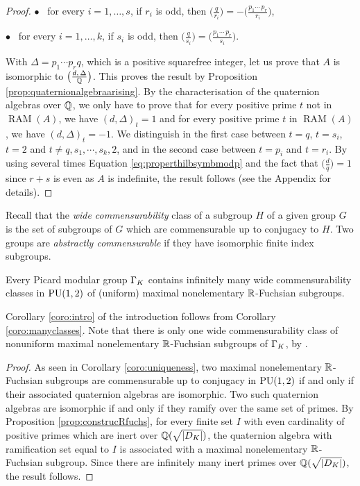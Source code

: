 \documentclass[11pt]{article}
\begin{document}
\begin{proof}
$\bullet$~ for every $i=1,\dots, s$, if $r_i$ is odd, then
$\big(\frac{q}{r_i}\big)= - \big(\frac{p_1\cdots\, p_r} {r_i}\big)$,

$\bullet$~ for every $i=1,\dots, k$, if $s_i$ is odd, then
$\big(\frac{q}{s_i}\big)= \big(\frac{p_1\cdots\, p_r} {s_i}\big)$.



With $\Delta=p_1\cdots p_r q$, which is a positive squarefree integer,
let us prove that $A$ is isomorphic to $\big(\frac{d, \,\Delta}
{{\mathbb Q}}\big)$. This proves the result by Proposition
\ref{prop:quaternionalgebraarising}. By the characterisation of the
quaternion algebras over ${\mathbb Q}$, we only have to prove that for every
positive prime $t$ not in $\operatorname{RAM}(A)$, we have
$(d,\Delta)_t=1$ and for every positive prime $t$ in
$\operatorname{RAM}(A)$, we have $(d,\Delta)_t=-1$. We distinguish in
the first case between $t=q$, $t=s_i$, $t=2$ and $t\neq q,s_1,\cdots,
s_k,2$, and in the second case between $t=p_i$ and $t=r_i$. By using
several times Equation \eqref{eq:properthilbsymbmodp} and the fact
that $\big(\frac{d}{q}\big)=1$ since $r+s$ is even as $A$ is
indefinite, the result follows (see the Appendix for details).
\end{proof}










 Recall that the {\it wide commensurability} class of a
subgroup $H$ of a given group $G$ is the set of subgroups of $G$
which are commensurable up to conjugacy to $H$. Two groups are {\it
  abstractly commensurable} if they have isomorphic finite index
subgroups.


\bcoro\label{coro:manyclasses} Every Picard modular group $\Gamma_K$
contains infinitely many wide commensurability classes in $\operatorname{PU}(1,2)$
of (uniform) maximal nonelementary ${\mathbb R}$-Fuchsian subgroups.  
\ecoro

Corollary \ref{coro:intro} of the introduction follows from Corollary
\ref{coro:manyclasses}. Note that there is only one wide commensurability
class of nonuniform maximal nonelementary
${\mathbb R}$-Fuchsian subgroups of $\Gamma_K$, by \cite[Thm.~8.2.7]{MacRei03}.

\begin{proof} As seen in Corollary \ref{coro:uniqueness}, two maximal
nonelementary ${\mathbb R}$-Fuchsian subgroups are commensurable up to
conjugacy in $\operatorname{PU}(1,2)$ if and only if their associated quaternion
algebras are isomorphic. Two such quaternion algebras are isomorphic
if and only if they ramify over the same set of primes. By Proposition
\ref{prop:construcRfuchs}, for every finite set $I$ with even cardinality of
positive primes which are inert over ${\mathbb Q}(\sqrt{|D_K|})$, the quaternion
algebra with ramification set equal to $I$ is associated with a
maximal nonelementary ${\mathbb R}$-Fuchsian subgroup. Since there are
infinitely many inert primes over ${\mathbb Q}(\sqrt{|D_K|})$, the result follows.
\end{proof}
\end{document}
